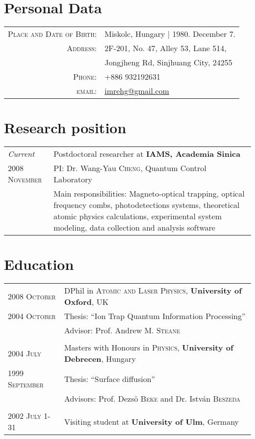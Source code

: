 \documentclass[10pt]{article}
\begin{document}
\thispagestyle{empty}
\par{}

\section{Personal Data}

\begin{tabular}{rl}
    \textsc{Place and Date of Birth:} & Miskolc, Hungary | 1980. December 7. \\
    \textsc{Address:}   & 2F-201, No. 47, Alley 53, Lane 514, \\
                        & Jongjheng Rd, Sinjhuang City, 24255 \\
    \textsc{Phone:}     & +886 932192631 \\
    \textsc{email:}     & \href{mailto:imrehg@gmail.com}{imrehg@gmail.com}
\end{tabular}

\section{Research position}
\begin{tabular}{p{3cm}|p{11cm}}
 \emph{Current} & Postdoctoral researcher at \textbf{IAMS, Academia Sinica}\\
\textsc{2008 November}& \small{PI: Dr. Wang-Yau \textsc{Cheng}, Quantum Control Laboratory}\\
&\footnotesize{Main responsibilities: Magneto-optical trapping, optical frequency combs, photodetections systems, theoretical atomic physics calculations, experimental system modeling, data collection and analysis software}
\end{tabular}

\section{Education}
\begin{tabular}{p{3cm}|p{11cm}}	
 \textsc{2008 October}& DPhil in \textsc{Atomic and Laser Physics}, \textbf{University of Oxford}, UK\\
 \textsc{2004 October} & Thesis: ``Ion Trap Quantum Information Processing'' \\ & \small Advisor: Prof. Andrew M. \textsc{Steane}\\\multicolumn{2}{c}{} \\

\textsc{2004 July} & Masters with Honours in \textsc{Physics}, \textbf{University of Debrecen}, Hungary\\
\textsc{1999 September} & Thesis: ``Surface diffusion'' \\ & \small Advisors: Prof. Dezs\"{o} \textsc{Beke} and Dr. Istv\'an \textsc{Beszeda}\\\multicolumn{2}{c}{} \\

\textsc{2002 July 1-31}& Visiting student at \textbf{University of Ulm}, Germany
\end{tabular}
\end{document}
